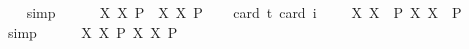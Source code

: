 \begin{isabellebody}
\isadelimproof
\ \ %
\endisadelimproof
%
\isatagproof
{}\isamarkupfalse%
\ simp%
\endisatagproof
{\isafoldproof}%
%
\isadelimproof
%
\endisadelimproof
\ \ \ \ \isanewline
{}\isamarkupfalse%
\ {\isachardoublequoteopen}{\isasymlfloor}{\isacharparenleft}{\isasymlambda}X{\isachardot}\ \isactrlbold {\isasymdiamond}\isactrlbold {\isasymexists}X{\isacharparenright}\ \isactrlbold {\isasymdown}{\isacharparenleft}P{\isacharcolon}{\isacharcolon}{\isasymup}{\isasymlangle}{\isasymlangle}{\isasymzero}{\isasymrangle}{\isasymrangle}{\isacharparenright}\ \isactrlbold {\isasymrightarrow}\ \isactrlbold {\isasymdiamond}{\isacharparenleft}{\isacharparenleft}{\isasymlambda}X{\isachardot}\ \isactrlbold {\isasymexists}X{\isacharparenright}\ \isactrlbold {\isasymdown}P{\isacharparenright}{\isasymrfloor}{\isachardoublequoteclose}\ \isanewline
\ \ \isamarkupfalse%
{\isacharbrackleft}card\ {\isacharprime}t{\isacharequal}{}{\isacharcomma}\ card\ i{\isacharequal}{}{\isacharbrackright}%
\isadelimproof
\ %
\endisadelimproof
%
\isatagproof
{}\isamarkupfalse%
\ %
%
\endisatagproof
{\isafoldproof}%
%
\isadelimproof
%
\endisadelimproof
\isanewline
{}\isamarkupfalse%
\ {\isachardoublequoteopen}{\isasymlfloor}{\isacharparenleft}{\isasymlambda}X{\isachardot}\ \isactrlbold {\isasymdiamond}\isactrlbold {\isasymexists}X{\isacharparenright}\ \ {\isacharparenleft}P{\isacharcolon}{\isacharcolon}{\isasymup}{\isasymlangle}{\isasymup}{\isasymlangle}{\isasymzero}{\isasymrangle}{\isasymrangle}{\isacharparenright}\isactrlbold {\isasymrightarrow}\ \isactrlbold {\isasymdiamond}{\isacharparenleft}{\isacharparenleft}{\isasymlambda}X{\isachardot}\ \isactrlbold {\isasymexists}X{\isacharparenright}\ \ P{\isacharparenright}{\isasymrfloor}{\isachardoublequoteclose}%
\isadelimproof
\ \ %
\endisadelimproof
%
\isatagproof
{}\isamarkupfalse%
\ simp%
\endisatagproof
{\isafoldproof}%
%
\isadelimproof
%
\endisadelimproof
\ \ \ \ \isanewline
{}\isamarkupfalse%
\ {\isachardoublequoteopen}{\isasymlfloor}{\isacharparenleft}{\isasymlambda}X{\isachardot}\ \isactrlbold {\isasymdiamond}\isactrlbold {\isasymexists}X{\isacharparenright}\ \isactrlbold {\isasymdown}{\isacharparenleft}P{\isacharcolon}{\isacharcolon}{\isasymup}{\isasymlangle}{\isasymup}{\isasymlangle}{\isasymzero}{\isasymrangle}{\isasymrangle}{\isacharparenright}\isactrlbold {\isasymrightarrow}\ \isactrlbold {\isasymdiamond}{\isacharparenleft}{\isacharparenleft}{\isasymlambda}X{\isachardot}\ \isactrlbold {\isasymexists}X{\isacharparenright}\ \isactrlbold {\isasymdown}P{\isacharparenright}{\isasymrfloor}{\isachardoublequoteclose}\ \isanewline

\end{isabellebody}
